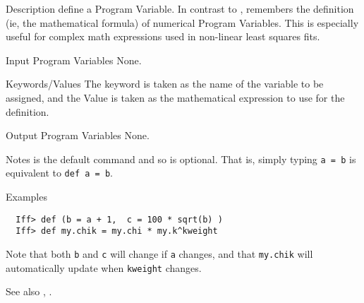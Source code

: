 
\begin{IFFcom}
\item[Description] define a Program Variable.  In contrast to {},
  {} remembers the definition (ie, the mathematical formula) of
  numerical Program Variables.  This is especially useful for complex math
  expressions used in non-linear least squares fits.
  
\item[Input Program Variables] None.
\item[Keywords/Values]  The keyword is taken as the name of the variable to
  be assigned, and the Value is taken as the mathematical expression to use
  for the definition. 
\item[Output Program Variables]  None.
  
\item[Notes] {} is the default command and so is optional.  That
  is, simply typing {\tt{a = b}} is equivalent to {\tt{def a = b}}.
\item[Examples] {\hspace{1.in} \vspace{-0.1truein} \relax }
\begin{verbatim} 
  Iff> def (b = a + 1,  c = 100 * sqrt(b) )
  Iff> def my.chik = my.chi * my.k^kweight
\end{verbatim} \noindent %
Note that both {\tt{b}} and {\tt{c}} will change if {\tt{a}} changes, and
that {\tt{my.chik}} will automatically update when {\tt{kweight}} changes.
\item[See also] {}, {}.
\end{IFFcom}



